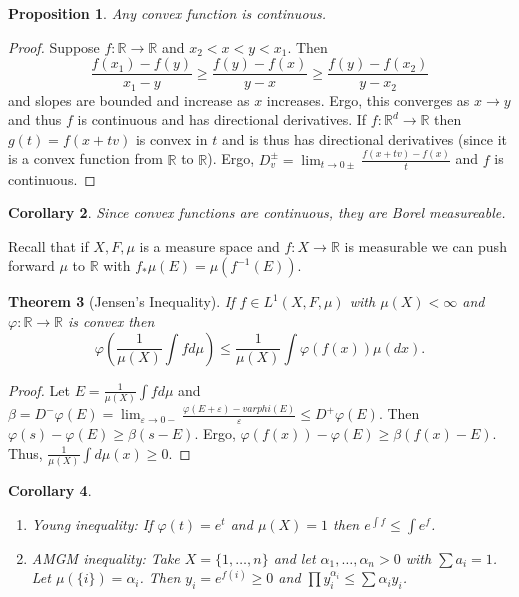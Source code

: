 \documentclass{article}
\newtheorem{theorem}{Theorem}[section]
\newtheorem{proposition}[theorem]{Proposition}
\newtheorem{corollary}[theorem]{Corollary}
\theoremstyle{definition}
\begin{document}
\begin{proposition}
    Any convex function is continuous.
\end{proposition}
\begin{proof}
    Suppose \(f:\mathbb{R}\rightarrow\mathbb{R} \) and \(x_2<x<y<x_1\). Then 
    \[
        \frac{f(x_1)-f(y)}{x_1-y}\geq\frac{f(y)-f(x)}{y-x}\geq \frac{f(y)-f(x_2)}{y-x_2}
    \]
    and slopes are bounded and increase as \(x\) increases. Ergo, this converges as \(x\to y\) and thus \(f\) is
    continuous and has directional derivatives. If \(f:\mathbb{R}^d\rightarrow\mathbb{R}\) then \(g(t)=f(x+tv)\) is convex in \(t\)
    and is thus has directional derivatives (since it is a convex function from \(\mathbb{R} \) to \(\mathbb{R} \)).
    Ergo, \(D_v^\pm = \lim_{t\to 0\pm} \frac{f(x+tv)-f(x)}{t}\) and \(f\) is continuous.
\end{proof}
\begin{corollary}
    Since convex functions are continuous, they are Borel measureable.
\end{corollary}

Recall that if \(X,F,\mu \) is a measure space and \(f:X\rightarrow \mathbb{R} \) is measurable we can push forward \(\mu \)
to \(\mathbb{R} \) with \(f_*\mu(E)=\mu(f^{-1}(E)) \).

\begin{theorem}[Jensen's Inequality]
If \(f\in L^1(X,F,\mu)\) with \(\mu(X)<\infty \) and \(\varphi:\mathbb{R}\rightarrow\mathbb{R} \) is convex then
    \[
        \varphi\left(\frac{1}{\mu(X)}\int fd\mu\right)\leq \frac{1}{\mu(X)}\int \varphi(f(x))\mu(dx).
    \]
\end{theorem}
\begin{proof}
    Let \(E=\frac{1}{\mu(X)}\int fd\mu \) and
    \(\beta=D^-\varphi(E)=\lim_{\varepsilon\to 0-}\frac{\varphi(E+\varepsilon)-varphi(E)}{\varepsilon}\leq D^+\varphi(E)\).
    Then \(\varphi(s)-\varphi(E)\geq \beta(s-E)\). Ergo, \(\varphi(f(x))-\varphi(E)\geq\beta(f(x)-E)\). Thus,
    \(\frac{1}{\mu(X)}\int d\mu(x)\geq 0\).
\end{proof}

\begin{corollary}
    \begin{enumerate}
        \item Young inequality: If \(\varphi(t)=e^t\) and \(\mu(X)=1\) then \(e^{\int f}\leq \int e^f\).
        \item AMGM inequality: Take \(X=\{1,\ldots, n\} \) and let \(\alpha_1,\ldots,\alpha_n>0\) with \(\sum a_i=1\).
        Let \(\mu(\{i\})=\alpha_i\). Then \(y_i=e^{f(i)}\geq 0\) and \(\prod y_i^{\alpha_i} \leq \sum \alpha_i y_i\).
    \end{enumerate}
\end{corollary}
\end{document}
